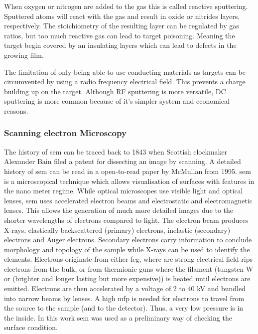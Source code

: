When oxygen or nitrogen are added to the gas this is called reactive sputtering.
Sputtered atoms will react with the gas and result in oxide or nitrides layers, respectively.
The stoichiometry of the resulting layer can be regulated by gas ratios, but too much reactive gas can lead to target poisoning. 
Meaning the target begin covered by an insulating layers which can lead to defects in the growing film\cite{Kelly2000}. 

The limitation of only being able to use conducting materials as targets can be circumvented by using a radio frequency electrical field. 
This prevents a charge building up on the target. %
Although RF sputtering is more versatile, DC sputtering is more common because of it's simpler system and economical reasons.

\subsubsection{Scanning electron Microscopy}
The history of \gls{sem} can be traced back to 1843 when Scottish clockmaker Alexander Bain filed a patent for dissecting an image by scanning. A detailed history of \gls{sem} can be read in a open-to-read paper by McMullan from 1995\cite{McMullan1995}. 
\Gls{sem} is a microscopical technique which allows visualisation of surfaces with features in the nano meter regime. 
While optical microscopes use visible light and optical lenses, \gls{sem} uses accelerated electron beams and electrostatic and electromagnetic lenses.
This allows the generation of much more detailed images due to the shorter wavelengths of electrons compared to light\cite{Kaliva2020}.
The electron beam produces X-rays, elastically backscattered (primary) electrons, inelastic (secondary) electrons and Auger electrons. 
Secondary electrons carry information to conclude morphology and topology of the sample while X-rays can be used to identify the elements. 
Electrons originate from either \gls{feg}, where are strong electrical field rips electrons from the bulk, or from thermionic guns where the filament (tungsten W or  (brighter and longer lasting but more expensive)) is heated until electrons are emitted. 
Electrons are then accelerated by a voltage of 2 to 40 kV and bundled into narrow beams\cite{Vernon2000} by lenses.
A high \gls{mfp} is needed for electrons to travel from the source to the sample (and to the detector). 
Thus, a very low pressure is in the inside. 
In this work \gls{sem} was used as a preliminary way of checking the surface condition. 


